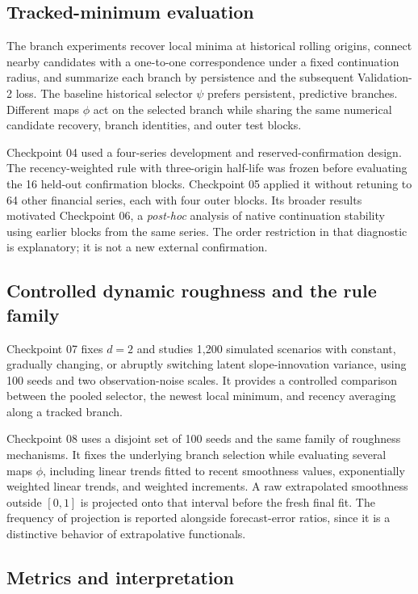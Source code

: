 \subsection{Tracked-minimum evaluation}

The branch experiments recover local minima at historical rolling
origins, connect nearby candidates with a one-to-one correspondence
under a fixed continuation radius, and summarize each branch by
persistence and the subsequent Validation-2 loss. The baseline
historical selector $\psi$ prefers persistent, predictive branches.
Different maps $\phi$ act on the selected branch while sharing the
same numerical candidate recovery, branch identities, and outer
test blocks.

Checkpoint 04 used a four-series development and reserved-confirmation
design. The recency-weighted rule with three-origin half-life was
frozen before evaluating the 16 held-out confirmation blocks.
Checkpoint 05 applied it without retuning to 64 other financial
series, each with four outer blocks. Its broader results motivated
Checkpoint 06, a \emph{post-hoc} analysis of native continuation
stability using earlier blocks from the same series. The order
restriction in that diagnostic is explanatory; it is not a new
external confirmation.

\subsection{Controlled dynamic roughness and the rule family}

Checkpoint 07 fixes $d=2$ and studies 1,200 simulated scenarios with
constant, gradually changing, or abruptly switching latent
slope-innovation variance, using 100 seeds and two observation-noise
scales. It provides a controlled comparison between the pooled
selector, the newest local minimum, and recency averaging along a
tracked branch.

Checkpoint 08 uses a disjoint set of 100 seeds and the same family
of roughness mechanisms. It fixes the underlying branch selection
while evaluating several maps $\phi$, including linear trends fitted
to recent smoothness values, exponentially weighted linear trends,
and weighted increments. A raw extrapolated smoothness outside
$[0,1]$ is projected onto that interval before the fresh final fit.
The frequency of projection is reported alongside forecast-error
ratios, since it is a distinctive behavior of extrapolative
functionals.

\subsection{Metrics and interpretation}

